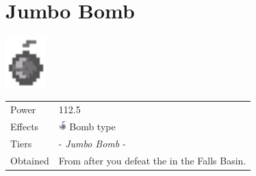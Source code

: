 \section{Jumbo Bomb}
\label{weapon:jumbo_bomb}

\includegraphics[height=2cm,keepaspectratio]{./resources/weapons/jumbobomb}

\begin{longtable}{ l p{9cm} }
	Power
	& 112.5
\\ %
	Effects
	& \includegraphics[height=1em,keepaspectratio]{./resources/effects/bomb}
	Bomb type
\\ %
	Tiers
	& \nameref{weapon:bomb} - \textit{Jumbo Bomb} - \nameref{weapon:mega_grenade}
\\ %
	Obtained
	& From \nameref{char:phoebe} after you defeat the \nameref{monster:snow_crab} in the Falls Basin.
\end{longtable}
